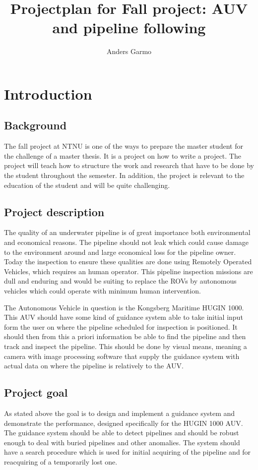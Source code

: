 \documentclass[a4paper,10pt]{article}
\title{Projectplan for Fall project: AUV and pipeline following}
\author{Anders Garmo}
\begin{document}
\maketitle
\newpage


\section{Introduction}

	\subsection{Background}
	The fall project at NTNU is one of the ways to prepare the master student for the challenge of a master thesis. It is a project on how to write a project. The project will teach how to structure the work and research that have to be done by the student throughout the semester. In addition, the project is relevant to the education of the student and will be quite challenging.
	
	
	\subsection{Project description}
	The quality of an underwater pipeline is of great importance both environmental and economical reasons. The pipeline should not leak which could cause damage to the environment around and large economical loss for the pipeline owner. Today the inspection to ensure these qualities are done using Remotely Operated Vehicles, which requires an human operator. This pipeline inspection missions are dull and enduring and would be suiting to replace the ROVs by autonomous vehicles which could operate with minimum human intervention.
	
	The Autonomous Vehicle in question is the Kongsberg Maritime HUGIN 1000. This AUV should have some kind of guidance system able to take initial input form the user on where the pipeline scheduled for inspection is positioned. It should then from this a priori information be able to find the pipeline and then track and inspect the pipeline. This should be done by visual means, meaning a camera with image processing software that supply the guidance system with actual data on where the pipeline is relatively to the AUV.
	
	\subsection{Project goal}
	As stated above the goal is to design and implement a guidance system and demonstrate the performance, designed specifically for the HUGIN 1000 AUV. The guidance system should be able to detect pipelines and should be robust enough to deal with buried pipelines and other anomalies. The system should have a search procedure which is used for initial acquiring of the pipeline and for reacquiring of a temporarily lost one. 
\end{document}

